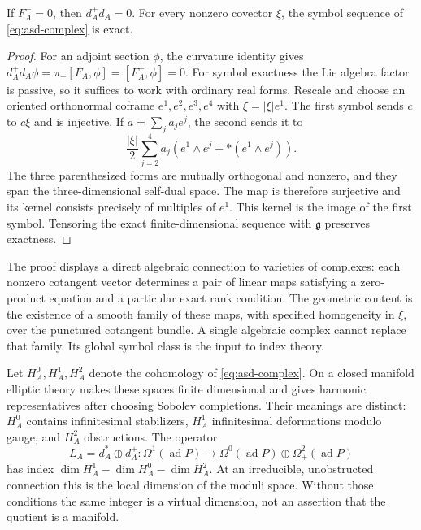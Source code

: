 \begin{theorem}
If $F_A^+=0$, then $d_A^+d_A=0$.  For every nonzero covector $\xi$,
the symbol sequence of \eqref{eq:asd-complex} is exact.
\end{theorem}

\begin{proof}
For an adjoint section $\phi$, the curvature identity gives
$d_A^+d_A\phi=\pi_+[F_A,\phi]=[F_A^+,\phi]=0$.
For symbol exactness the Lie algebra factor is passive, so it suffices to
work with ordinary real forms.  Rescale and choose an oriented orthonormal
coframe $e^1,e^2,e^3,e^4$ with $\xi=|\xi|e^1$.  The first symbol sends
$c$ to $c\xi$ and is injective.  If
$a=\sum_j a_je^j$, the second sends it to
\[
 \frac{|\xi|}{2}\sum_{j=2}^4a_j
 \left(e^1\wedge e^j+*(e^1\wedge e^j)\right).
\]
The three parenthesized forms are mutually orthogonal and nonzero, and
they span the three-dimensional self-dual space.  The map is therefore
surjective and its kernel consists precisely of multiples of $e^1$.
This kernel is the image of the first symbol.  Tensoring the exact
finite-dimensional sequence with $\mathfrak g$ preserves exactness.
\end{proof}

The proof displays a direct algebraic connection to varieties of complexes:
each nonzero cotangent vector determines a pair of linear maps satisfying a
zero-product equation and a particular exact rank condition.  The geometric
content is the existence of a smooth family of these maps, with specified
homogeneity in $\xi$, over the punctured cotangent bundle.  A single
algebraic complex cannot replace that family.  Its global symbol class is
the input to index theory.

Let $H_A^0,H_A^1,H_A^2$ denote the cohomology of
\eqref{eq:asd-complex}.  On a closed manifold elliptic theory makes these
spaces finite dimensional and gives harmonic representatives after choosing
Sobolev completions.  Their meanings are distinct: $H_A^0$ contains
infinitesimal stabilizers, $H_A^1$ infinitesimal deformations modulo gauge,
and $H_A^2$ obstructions.  The operator
\[
 L_A=d_A^*\oplus d_A^+:
 \Omega^1(\operatorname{ad}P)\longrightarrow
 \Omega^0(\operatorname{ad}P)\oplus\Omega^2_+(\operatorname{ad}P)
\]
has index $\dim H_A^1-\dim H_A^0-\dim H_A^2$.
At an irreducible, unobstructed connection this is the local dimension of
the moduli space.  Without those conditions the same integer is a virtual
dimension, not an assertion that the quotient is a manifold.

